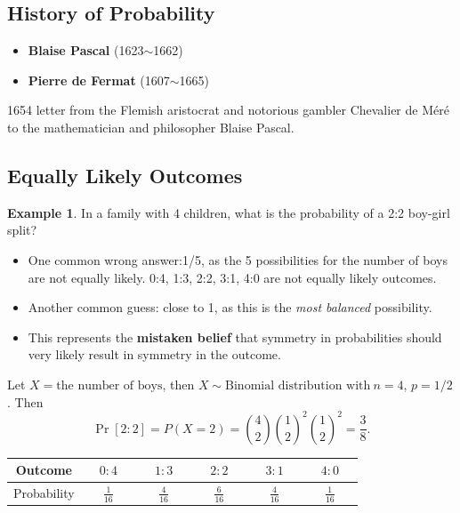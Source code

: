 \documentclass[12pt,a4paper]{article}
\theoremstyle{definition}
\newtheorem{example}{Example}[section]
\theoremstyle{definition}
\theoremstyle{definition}
\theoremstyle{definition}
\theoremstyle{remark}
\theoremstyle{definition}
\newcommand{\dispsty}{\displaystyle}
\begin{document}
\newpage
\subsection{History of Probability}
\begin{itemize}
	\item \textbf{Blaise Pascal} (1623$\sim$1662)
	\item \textbf{Pierre de Fermat} (1607$\sim$1665)
\end{itemize}
1654 letter from the Flemish aristocrat and notorious gambler Chevalier de M\'{e}r\'{e} to the mathematician and philosopher Blaise Pascal.

\subsection{Equally Likely Outcomes}
\begin{example}
	In a family with 4 children, what is the probability of a 2:2 boy-girl split?\begin{itemize}
		\item One common wrong answer:1/5, as the 5 possibilities for the number of boys are not equally likely. 0:4, 1:3, 2:2, 3:1, 4:0 are not equally likely outcomes.
		\item Another common guess: close to 1, as this is the \textit{most balanced} possibility.
		\item This represents the \textbf{mistaken belief} that symmetry in probabilities should very likely result in symmetry in the outcome.
	\end{itemize}
Let $X=\text{the number of boys}$, then $X\sim\text{Binomial distribution with}\ n=4$, $p=1/2$. Then \[
\Pr[2:2]=P(X=2)=\binom{4}{2}\binom{1}{2}^2\binom{1}{2}^2=\frac{3}{8}.
\]\begin{center}
	\begin{tabular}{|c|ccc|ccc|ccc|ccc|ccc|}
	\toprule
	Outcome && $0:4$ &&& $1:3$ &&& $2:2$ &&& $3:1$ &&& $4:0$ & \\
	\midrule
	Probability && $\dispsty\frac{1}{16}$ &&& $\dispsty\frac{4}{16}$ &&& $\dispsty\frac{6}{16}$ &&& $\dispsty\frac{4}{16}$ &&& $\dispsty\frac{1}{16}$ &\\
	\bottomrule
\end{tabular}
\end{center}
\end{example}\
\end{document}
